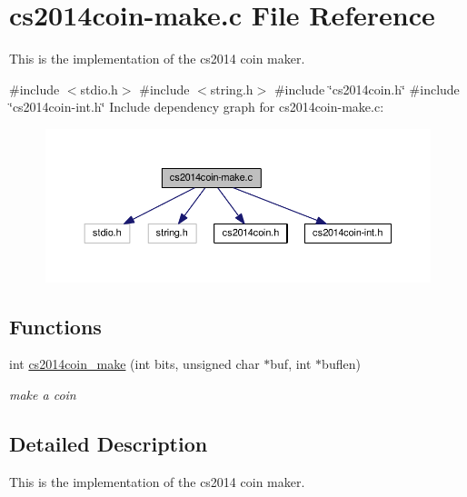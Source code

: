 \hypertarget{cs2014coin-make_8c}{}\section{cs2014coin-\/make.c File Reference}
\label{cs2014coin-make_8c}


This is the implementation of the cs2014 coin maker.  


{\ttfamily \#include $<$stdio.\+h$>$}\newline
{\ttfamily \#include $<$string.\+h$>$}\newline
{\ttfamily \#include \char`\"{}cs2014coin.\+h\char`\"{}}\newline
{\ttfamily \#include \char`\"{}cs2014coin-\/int.\+h\char`\"{}}\newline
Include dependency graph for cs2014coin-\/make.c\+:\nopagebreak
\begin{figure}[H]
\begin{center}
\leavevmode
\includegraphics[width=350pt]{cs2014coin-make_8c__incl}
\end{center}
\end{figure}
\subsection*{Functions}
\begin{DoxyCompactItemize}
\item 
int \hyperlink{cs2014coin-make_8c_a71eabb5a75b43b92f05f52bff713e429}{cs2014coin\+\_\+make} (int bits, unsigned char $\ast$buf, int $\ast$buflen)
\begin{DoxyCompactList}\small\item\em make a coin \end{DoxyCompactList}\end{DoxyCompactItemize}


\subsection{Detailed Description}
This is the implementation of the cs2014 coin maker. 

